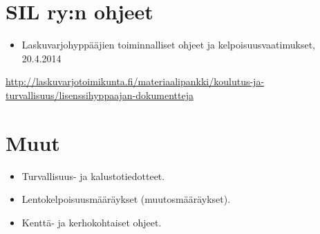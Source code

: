 \section{ SIL ry:n ohjeet }
\label{maaraykset-lait-ja-ohjeet-sil-ry-n-ohjeet}

\begin{itemize}
\item  Laskuvarjohyppääjien toiminnalliset ohjeet ja kelpoisuusvaatimukset, 20.4.2014 
\end{itemize}

\raggedright
\url{http://laskuvarjotoimikunta.fi/materiaalipankki/koulutus-ja-turvallisuus/lisenssihyppaajan-dokumentteja}

\section{ Muut }
\label{maaraykset-lait-ja-ohjeet-muut}

\begin{itemize}
\item  Turvallisuus- ja kalustotiedotteet. 
\item  Lentokelpoisuusmääräykset (muutosmääräykset). 
\item  Kenttä- ja kerhokohtaiset ohjeet. 
\end{itemize}
